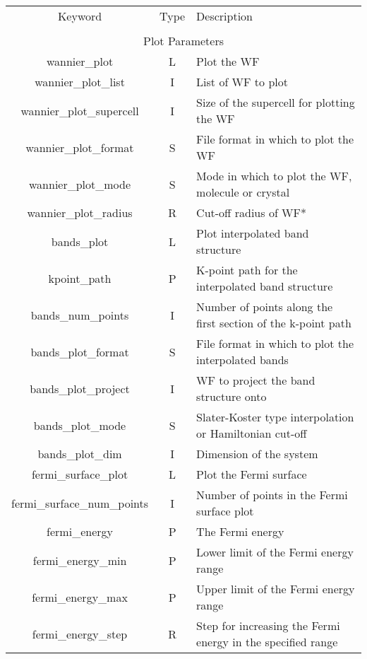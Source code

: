 \begin{table}
\begin{center}
\begin{tabular}{|c|c|p{6cm}|}
  \hline
  Keyword & Type & Description \\
  &      &             \\
  \hline\hline
  \multicolumn{3}{|c|}{Plot Parameters} \\
  \hline
  {\sc wannier\_plot }   & L & Plot the WF \\
  {\sc wannier\_plot\_list } & I & List of WF to plot \\
  {\sc wannier\_plot\_supercell }   & I & Size of the supercell for
  plotting the WF \\
  {\sc wannier\_plot\_format }   & S & File format in which to plot the
  WF \\
  {\sc wannier\_plot\_mode }   & S & Mode in which to plot the
  WF, molecule or crystal \\ 
  {\sc wannier\_plot\_radius } & R & Cut-off radius of WF* \\ 
  {\sc bands\_plot }   & L & Plot interpolated band structure \\
  {\sc kpoint\_path }   & P & K-point path for the interpolated band structure  \\
  {\sc bands\_num\_points }   & I & Number of points along the first
  section of the k-point path \\
  {\sc bands\_plot\_format }   & S & File format in which to plot the
  interpolated bands \\
  {\sc bands\_plot\_project } & I & WF to project the band structure onto \\
  {\sc bands\_plot\_mode }   & S & Slater-Koster type interpolation or
  Hamiltonian cut-off \\
  {\sc bands\_plot\_dim } & I & Dimension of the system \\
  {\sc fermi\_surface\_plot }   & L & Plot the Fermi surface \\
  {\sc fermi\_surface\_num\_points }   & I & Number of points in the Fermi
  surface plot\\
  {\sc fermi\_energy }   & P & The Fermi energy \\
  {\sc fermi\_energy\_min }   & P & Lower limit of
  the Fermi energy range\\
  {\sc fermi\_energy\_max }   & P & Upper limit of
  the Fermi energy range\\
  {\sc fermi\_energy\_step }   & R & Step for increasing the 
Fermi energy in the specified range\\

\end{tabular}
\end{center}
\end{table}
